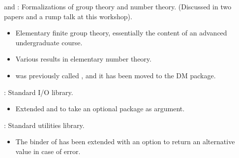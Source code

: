 
\begin{frame}

\implibtitle

 and :
Formalizations of group theory and number theory.
(Discussed in two papers and a rump talk at this workshop).
\begin{itemize}
\item Elementary finite group theory,
  essentially the content of an advanced undergraduate course.
\item Various results in elementary number theory.
\item {} was previously called
  , and it has been moved to the DM
  package.
\end{itemize}

\end{frame}


\begin{frame}

\implibtitle

:
Standard I/O library.
\begin{itemize}
\item Extended  and 
      to take an optional package as argument.
\end{itemize}

\end{frame}


\begin{frame}

\implibtitle

:
Standard utilities library.
\begin{itemize}
\item The  binder of  has been extended with
      an option  to return an alternative value in case of error.
\end{itemize}

\end{frame}


